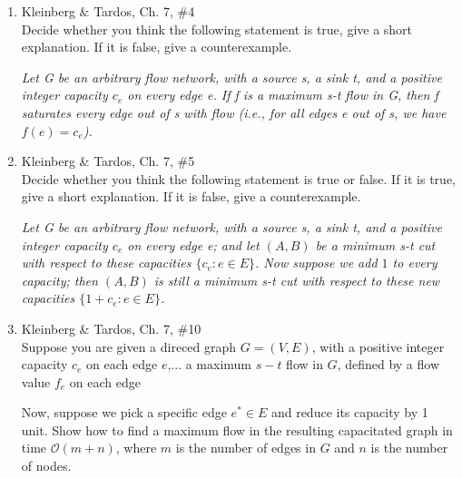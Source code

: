 \documentclass[11pt,dvipsnames]{article}
\newcommand{\KT}[2]{Kleinberg \& Tardos, Ch. #1, \##2}
\theoremstyle{remark}
\begin{document}
\begin{enumerate}
\newpage
\item \KT{7}{4}\\
Decide whether you think the following statement is 
true, give a short explanation. If it is false, give a counterexample.
\begin{addmargin}[2em]{0em}
\textit{%
Let G be an arbitrary flow network, with a source s, a sink t, and a positive
integer capacity $c_e$ on every edge e. If f is a maximum s-t flow in G, then f
saturates every edge out of s with flow (i.e., for all edges e out of s, we have
$f(e)=c_e$).}
\end{addmargin}

\newpage
\item \KT{7}{5}\\
Decide whether you think the following statement is true or false. If it is
true, give a short explanation. If it is false, give a counterexample.
\begin{addmargin}[2em]{0em}
\textit{%
Let G be an arbitrary flow network, with a source s, a sink t, and a positive
integer capacity $c_e$ on every edge e; and let $(A,B)$ be a minimum s-t cut with
respect to these capacities $\{c_e:e\in E\}$. Now suppose we add $1$ to every capacity;
then $(A,B)$ is still a minimum s-t cut with respect to these new capacities
$\{1+c_e:e\in E\}$.
}
\end{addmargin}

\newpage
\item \KT{7}{10}\\
Suppose you are given a direced graph $G=(V,E)$, with a positive integer
capacity $c_e$ on each edge $e$,...
a maximum $s-t$ flow in $G$, defined by a flow value $f_e$ on each edge
\par Now, suppose we pick a specific edge $e^*\in E$ and reduce its capacity
by 1 unit. Show how to find a maximum flow in the resulting capacitated
graph in time $\mathcal{O}(m+n)$, where $m$ is the number of edges in $G$ and $n$ is the
number of nodes.


\end{enumerate}
\end{document}
